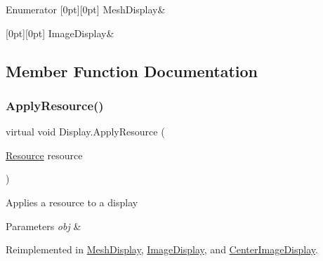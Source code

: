 \begin{DoxyEnumFields}{Enumerator}
[0pt][0pt]{}\mbox{\label{class_display_a7f7abc559192ef7e8f4a03382d3492d7a6465642df623349960f917dcf68ba989}} 
Mesh\+Display&\\
\hline

[0pt][0pt]{}\mbox{\label{class_display_a7f7abc559192ef7e8f4a03382d3492d7a6790a36b5a0528029d4ed43891266fcb}} 
Image\+Display&\\
\hline

\end{DoxyEnumFields}


\subsection{Member Function Documentation}
\mbox{\label{class_display_aa1d23e0e870c59c63e2f040e84ef0121}} 
\subsubsection{\texorpdfstring{Apply\+Resource()}{ApplyResource()}}
{\footnotesize\ttfamily virtual void Display.\+Apply\+Resource (\begin{DoxyParamCaption}\item[{\mbox{\hyperlink{class_resource}{Resource}}}]{resource }\end{DoxyParamCaption})\hspace{0.3cm}{\ttfamily [virtual]}}



Applies a resource to a display 


\begin{DoxyParams}{Parameters}
{\em obj} & \\
\hline
\end{DoxyParams}


Reimplemented in \mbox{\hyperlink{class_mesh_display_aff3b19b74dd530fdf299b4feee319691}{Mesh\+Display}}, \mbox{\hyperlink{class_image_display_a733a86ef960e7836442e858b5d52dbec}{Image\+Display}}, and \mbox{\hyperlink{class_center_image_display_aca1aaf14b20d538cafb0c7731b8be2bb}{Center\+Image\+Display}}.

